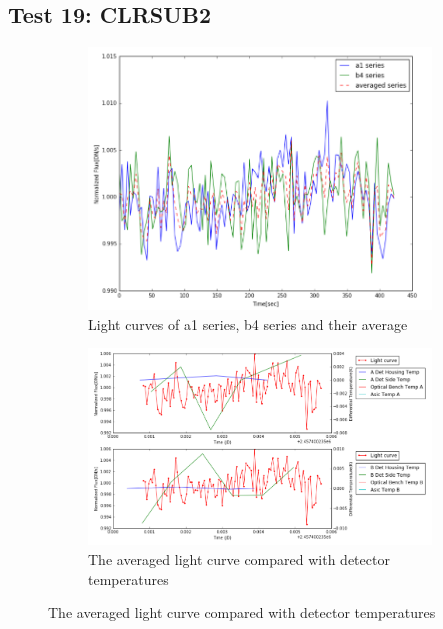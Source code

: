 \documentclass{aastex6}
\begin{document}
\subsection{Test 19: CLRSUB2} 
\begin{figure}[H]
    \centering
    \begin{subfigure}{1}
        \includegraphics[scale=0.4]{ts_test19}
        \caption{Light curves of a1 series, b4 series and their average}
    \end{subfigure}

    \begin{subfigure}{2}
        \includegraphics[scale=0.4]{temp_test19}
        \caption{The averaged light curve compared with detector temperatures}
    \end{subfigure}
   

\end{figure}
\end{document}

